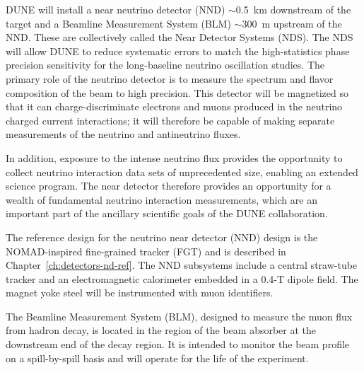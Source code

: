 DUNE will install a near neutrino detector (NND) $\sim$0.5~km
downstream of the target and a Beamline Measurement System (BLM)
$\sim$300~m upstream of the NND. These are collectively called the
Near Detector Systems (NDS).  The NDS will allow DUNE to reduce
systematic errors to match the high-statistics phase precision sensitivity
for the long-baseline neutrino oscillation studies.  The primary role
of the neutrino detector is to measure the spectrum and flavor
composition of the beam to high precision. This detector will be
magnetized so that it can charge-discriminate electrons and muons
produced in the neutrino charged current interactions; it will
therefore be capable of making separate measurements of the neutrino
and antineutrino fluxes.
%

In addition, exposure to the intense neutrino flux provides the
opportunity to collect neutrino interaction data sets of unprecedented
size, enabling an extended science program.  The near detector
therefore provides an opportunity for a wealth of fundamental neutrino
interaction measurements, which are an important part of the ancillary
scientific goals of the DUNE collaboration.

The reference design for the neutrino near detector (NND) design is
the NOMAD-inspired fine-grained tracker (FGT) and is described in
Chapter~\ref{ch:detectors-nd-ref}. The NND subsystems include a
central straw-tube tracker and an electromagnetic calorimeter embedded
in a 0.4-T dipole field. The magnet yoke steel will be instrumented
with muon identifiers.

The Beamline Measurement System (BLM), designed to measure the muon
flux from hadron decay, is located in the region of the beam absorber
at the downstream end of the decay region. It is intended to monitor
the beam profile on a spill-by-spill basis and will operate for the
life of the experiment.
